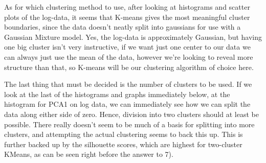 \documentclass{article}
\begin{document}
As for which clustering method to use, after looking at histograms and
scatter plots of the log-data, it seems that K-means gives the most
meaningful cluster boundaries, since the data doesn't neatly split into
gaussians for use with a Gaussian Mixture model. Yes, the log-data is
approximately Gaussian, but having one big cluster isn't very
instructive, if we want just one center to our data we can always just
use the mean of the data, however we're looking to reveal more structure
than that, so K-means will be our clustering algorithm of choice here.

The last thing that must be decided is the number of clusters to be
used. If we look at the last of the histograms and graphs immediately
below, at the histogram for PCA1 on log data, we can immediately see how
we can split the data along either side of zero. Hence, division into
two clusters should at least be possible. There really doesn't seem to
be much of a basis for splitting into more clusters, and attempting the
actual clustering seems to back this up. This is further backed up by
the silhouette scores, which are highest for two-cluster KMeans, as can
be seen right before the answer to 7).
\end{document}
